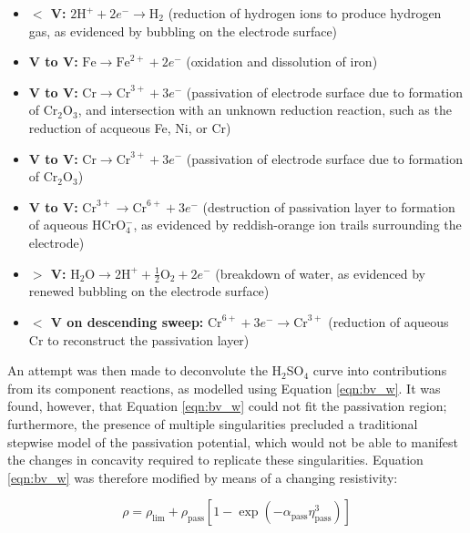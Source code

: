 \singlespacing
\begin{itemize}
	\item \textbf{$<$  V:} $2 \text{H}^+ + 2 e^- \rightarrow \text{H}_2$ (reduction of hydrogen ions to produce hydrogen gas, as evidenced by bubbling on the electrode surface)
	\item \textbf{ V to  V:} $\text{Fe} \rightarrow \text{Fe}^{2+} + 2 e^-$ (oxidation and dissolution of iron)
	\item\textbf{ V to  V:} $\text{Cr} \rightarrow \text{Cr}^{3+} + 3 e^-$ (passivation of electrode surface due to formation of Cr$_2$O$_3$, and intersection with an unknown reduction reaction, such as the reduction of acqueous Fe, Ni, or Cr)
	\item\textbf{ V to  V:} $\text{Cr} \rightarrow \text{Cr}^{3+} + 3 e^-$ (passivation of electrode surface due to formation of Cr$_2$O$_3$)
	\item\textbf{ V to  V:} $\text{Cr}^{3+} \rightarrow \text{Cr}^{6+} + 3 e^-$ (destruction of passivation layer to formation of aqueous HCrO$_4^-$, as evidenced by reddish-orange ion trails surrounding the electrode)
	\item \textbf{$>$  V:} $\text{H}_2\text{O} \rightarrow 2 \text{H}^+ + \frac{1}{2} \text{O}_2 + 2 e^-$ (breakdown of water, as evidenced by renewed bubbling on the electrode surface)
	\item \textbf{$<$  V on descending sweep:} $\text{Cr}^{6+} + 3 e^- \rightarrow \text{Cr}^{3+}$ (reduction of aqueous Cr to reconstruct the passivation layer)

\end{itemize}
\doublespacing

An attempt was then made to deconvolute the H$_2$SO$_4$ curve into contributions from its component reactions, as modelled using Equation \ref{eqn:bv_w}.  It was found, however, that Equation \ref{eqn:bv_w} could not fit the passivation region; furthermore, the presence of multiple singularities precluded a traditional stepwise model of the passivation potential, which would not be able to manifest the changes in concavity required to replicate these singularities.  Equation \ref{eqn:bv_w} was therefore modified by means of a changing resistivity:

	
	\begin{equation}
		\rho = \rho_{\text{lim}} + 
		\rho_{\text{pass}} \left[
			1 - \exp (- \alpha_{\text{pass}} \eta_{\text{pass}}^3) \right]
		\label{eqn:rho_jmak}
	\end{equation}

